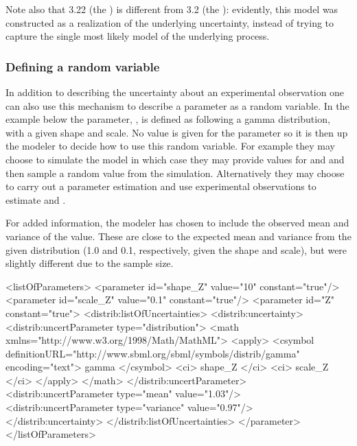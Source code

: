 \documentclass[draftspec]{sbmlpkgspec}
\begin{document}
Note also that 3.22 (the ) is different from 3.2 (the ):  evidently, this model was constructed as a realization of the underlying uncertainty, instead of trying to capture the single most likely model of the underlying process.


\subsubsection{Defining a random variable}

In addition to describing the uncertainty about an experimental
observation one can also use this mechanism to describe a parameter as
a random variable. In the example below the parameter, , is defined
as following a gamma distribution, with a given shape and scale. No
value is given for the parameter so it is then up the modeler to
decide how to use this random variable. For example they may choose to
simulate the model in which case they may provide values for 
and  and then sample a random value from the
simulation. Alternatively they may choose to carry out a parameter
estimation and use experimental observations to estimate  and
.

For added information, the modeler has chosen to include the observed mean and variance of the value.  These are close to the expected mean and variance from the given distribution (1.0 and 0.1, respectively, given the shape and scale), but were slightly different due to the sample size.

\begin{example}
<listOfParameters>
  <parameter id="shape_Z" value="10" constant="true"/>
  <parameter id="scale_Z" value="0.1" constant="true"/>
  <parameter id="Z" constant="true">
    <distrib:listOfUncertainties>
      <distrib:uncertainty>
        <distrib:uncertParameter type="distribution">
          <math xmlns="http://www.w3.org/1998/Math/MathML">
            <apply>
              <csymbol definitionURL="http://www.sbml.org/sbml/symbols/distrib/gamma"
                       encoding="text"> gamma </csymbol>
              <ci> shape_Z </ci>
              <ci> scale_Z </ci>
            </apply>
          </math>
        </distrib:uncertParameter>
        <distrib:uncertParameter type="mean" value="1.03"/>
        <distrib:uncertParameter type="variance" value="0.97"/>
      </distrib:uncertainty>
    </distrib:listOfUncertainties>
  </parameter>
</listOfParameters>
\end{example}
\end{document}
